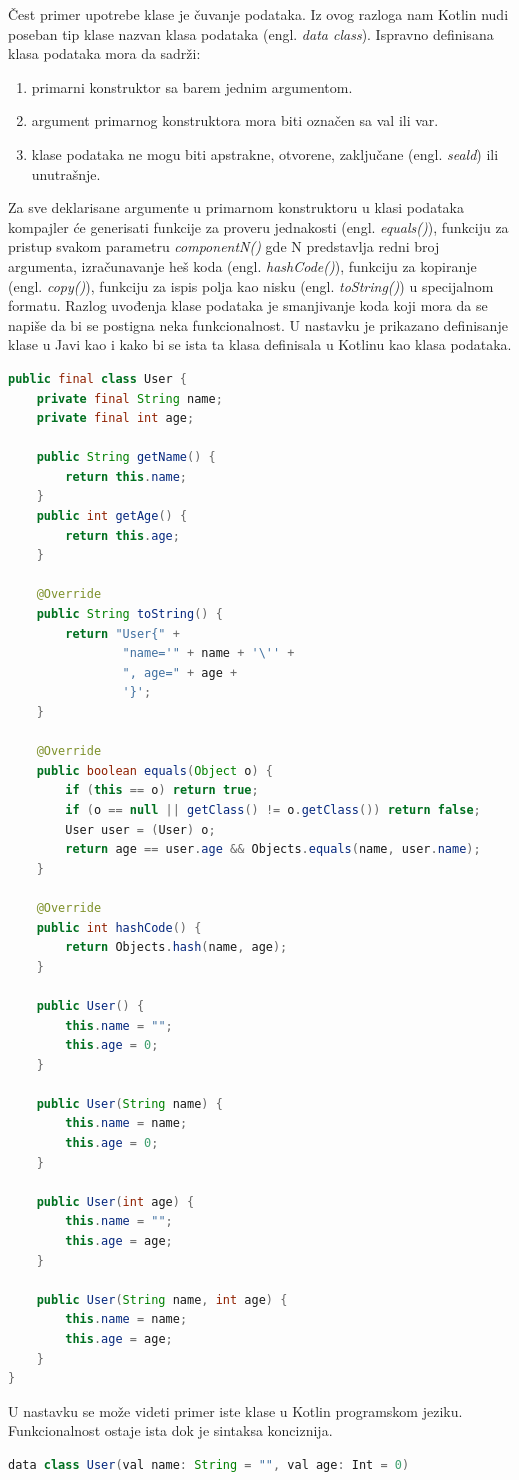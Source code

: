\documentclass[12pt,oneside]{memoir}
\begin{document}
Čest primer upotrebe klase je čuvanje podataka. Iz ovog razloga nam Kotlin nudi poseban tip klase nazvan klasa podataka (engl. \emph{data class}). Ispravno definisana klasa podataka mora da sadrži:
\begin{enumerate}
  \item primarni konstruktor sa barem jednim argumentom.
  \item argument primarnog konstruktora mora biti označen sa val ili var.
  \item klase podataka ne mogu biti apstrakne, otvorene, zaključane (engl. \emph{seald}) ili unutrašnje.
\end{enumerate}


Za sve deklarisane argumente u primarnom konstruktoru u klasi podataka kompajler će generisati funkcije za proveru jednakosti (engl. \emph{equals()}), funkciju za pristup svakom parametru \emph{componentN()} gde N predstavlja redni broj argumenta, izračunavanje heš koda (engl. \emph{hashCode()}), funkciju za kopiranje (engl. \emph{copy()}), funkciju za ispis polja kao nisku (engl. \emph{toString()}) u specijalnom formatu. Razlog uvođenja klase podataka je smanjivanje koda koji mora da se napiše da bi se postigna neka funkcionalnost. U nastavku je prikazano definisanje klase u Javi kao i kako bi se ista ta klasa definisala u Kotlinu kao klasa podataka.

\begin{lstlisting}[caption={Java klasa},captionpos=t, language=Java]
  public final class User {
    private final String name;
    private final int age;

    public String getName() {
        return this.name;
    }
    public int getAge() {
        return this.age;
    }

    @Override
    public String toString() {
        return "User{" +
                "name='" + name + '\'' +
                ", age=" + age +
                '}';
    }

    @Override
    public boolean equals(Object o) {
        if (this == o) return true;
        if (o == null || getClass() != o.getClass()) return false;
        User user = (User) o;
        return age == user.age && Objects.equals(name, user.name);
    }

    @Override
    public int hashCode() {
        return Objects.hash(name, age);
    }

    public User() {
        this.name = "";
        this.age = 0;
    }

    public User(String name) {
        this.name = name;
        this.age = 0;
    }

    public User(int age) {
        this.name = "";
        this.age = age;
    }

    public User(String name, int age) {
        this.name = name;
        this.age = age;
    }
}
\end{lstlisting}
U nastavku se može videti primer iste klase u Kotlin programskom jeziku. Funkcionalnost ostaje ista dok je sintaksa konciznija.
\begin{lstlisting}[caption={Kotlin klasa},captionpos=t, language=Java]
data class User(val name: String = "", val age: Int = 0)
\end{lstlisting}
\end{document}
